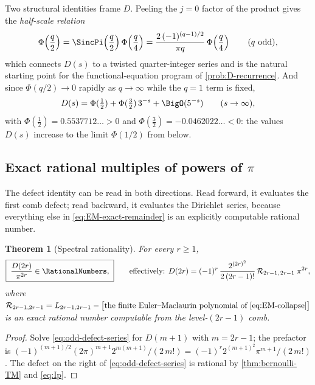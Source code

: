 \documentclass[11pt,oneside]{article}
\numberwithin{equation}{section}
\newtheorem{theorem}{Theorem}[section]
\theoremstyle{definition}
\theoremstyle{remark}
\newcommand{\defect}{\mathcal R}
\begin{document}
Two structural identities frame $D$.  Peeling the $j=0$ factor of the
product gives the \emph{half-scale relation}
\begin{equation}
 \Phi\!\left(\frac q2\right)
 =\SincPi\!\left(\frac q2\right)\Phi\!\left(\frac q4\right)
 =\frac{2\,(-1)^{(q-1)/2}}{\pi q}\,
 \Phi\!\left(\frac q4\right)
 \qquad(q\ \text{odd}),
 \label{eq:half-scale}
\end{equation}
which connects $D(s)$ to a twisted quarter-integer series and is the
natural starting point for the functional-equation program of
\cref{prob:D-recurrence}.  And since $\Phi(q/2)\to0$ rapidly as
$q\to\infty$ while the $q=1$ term is fixed,
\begin{equation}
 D(s)=\Phi(\tfrac12)+\Phi(\tfrac32)\,3^{-s}+\BigO(5^{-s})
 \qquad(s\to\infty),
 \label{eq:D-first-harmonic}
\end{equation}
with $\Phi(\tfrac12)=0.5537712\ldots>0$ and
$\Phi(\tfrac32)=-0.0462022\ldots<0$: the values $D(s)$ increase to the
limit $\Phi(1/2)$ from below.

\subsection{Exact rational multiples of powers of \texorpdfstring{$\pi$}{pi}}

The defect identity can be read in both directions.  Read forward, it
evaluates the first comb defect; read backward, it evaluates the
Dirichlet series, because everything else in
\eqref{eq:EM-exact-remainder} is an explicitly computable rational
number.

\begin{theorem}[Spectral rationality]
\label{thm:D-rational}
For every $r\ge1$,
\begin{equation}
 \boxed{\;\frac{D(2r)}{\pi^{2r}}\in\RationalNumbers,\;}
 \qquad\text{effectively: }
 D(2r)
 =(-1)^{r}\,
 \frac{2^{(2r)^2}}{2\,(2r-1)!}\,
 \defect_{2r-1,\,2r-1}\;\pi^{2r},
 \label{eq:D-rational}
\end{equation}
where $\defect_{2r-1,2r-1}=L_{2r-1,2r-1}-\bigl[\text{the finite
Euler--Maclaurin polynomial of \eqref{eq:EM-collapse}}\bigr]$ is an
exact rational number computable from the level-$(2r-1)$ comb.
\end{theorem}

\begin{proof}
Solve \eqref{eq:odd-defect-series} for $D(m+1)$ with $m=2r-1$; the
prefactor is
$(-1)^{(m+1)/2}(2\pi)^{m+1}2^{m(m+1)}/(2\,m!)
=(-1)^{r}2^{(m+1)^2}\pi^{m+1}/(2\,m!)$.  The defect on the right of
\eqref{eq:odd-defect-series} is rational by
\cref{thm:bernoulli-TM} and \eqref{eq:Ip}.
\end{proof}
\end{document}
